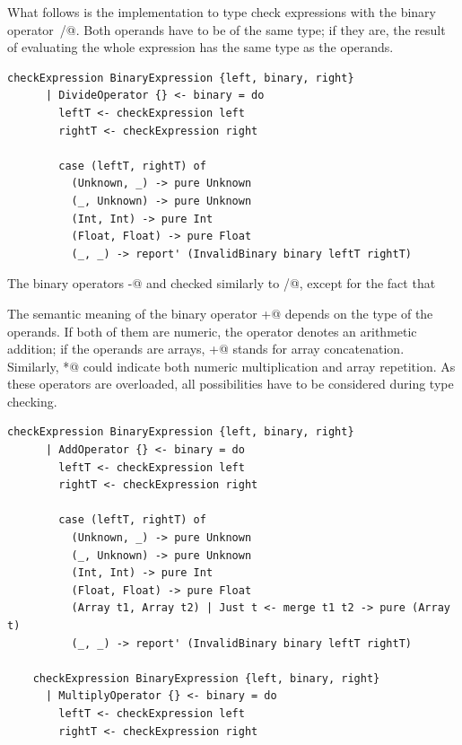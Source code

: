 \documentclass[UdineBachThesis,american,11pt]{PhdThesis}
\begin{document}
  What follows is the implementation to type check expressions with the binary
  operator~\lstinline@/@. Both operands have to be of the same type; if they
  are, the result of evaluating the whole expression has the same type as the
  operands.

  \begin{lstlisting}[gobble=4,basicstyle=\ttfamily\small]
    checkExpression BinaryExpression {left, binary, right}
      | DivideOperator {} <- binary = do
        leftT <- checkExpression left
        rightT <- checkExpression right

        case (leftT, rightT) of
          (Unknown, _) -> pure Unknown
          (_, Unknown) -> pure Unknown
          (Int, Int) -> pure Int
          (Float, Float) -> pure Float
          (_, _) -> report' (InvalidBinary binary leftT rightT)
  \end{lstlisting}

  The binary operators \lstinline@-@ and \lstinline@%@ are type
  checked similarly to \lstinline@/@, except for the fact that
  \lstinline@%@ only accepts operands of type \lstinline@Int@.

  The semantic meaning of the binary operator \lstinline@+@ depends on the type
  of the operands. If both of them are numeric, the operator denotes an
  arithmetic addition; if the operands are arrays, \lstinline@+@ stands for
  array concatenation. Similarly, \lstinline@*@ could indicate both numeric
  multiplication and array repetition. As these operators are overloaded, all
  possibilities have to be considered during type checking.

  \begin{lstlisting}[gobble=4,basicstyle=\ttfamily\small]
    checkExpression BinaryExpression {left, binary, right}
      | AddOperator {} <- binary = do
        leftT <- checkExpression left
        rightT <- checkExpression right

        case (leftT, rightT) of
          (Unknown, _) -> pure Unknown
          (_, Unknown) -> pure Unknown
          (Int, Int) -> pure Int
          (Float, Float) -> pure Float
          (Array t1, Array t2) | Just t <- merge t1 t2 -> pure (Array t)
          (_, _) -> report' (InvalidBinary binary leftT rightT)

    checkExpression BinaryExpression {left, binary, right}
      | MultiplyOperator {} <- binary = do
        leftT <- checkExpression left
        rightT <- checkExpression right
  \end{lstlisting}
\end{document}
